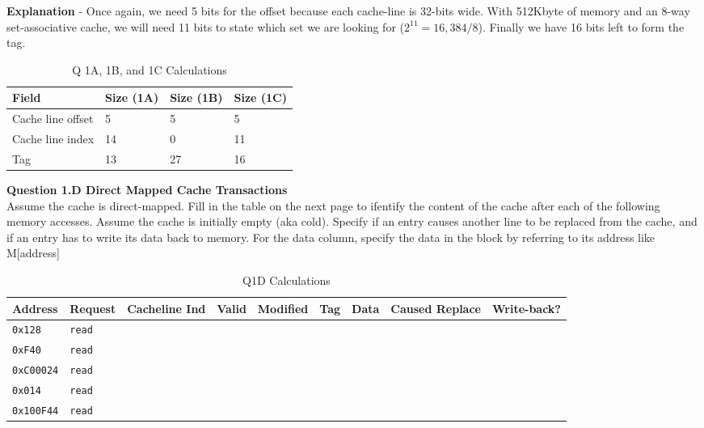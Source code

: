 \documentclass[a4paper,11pt]{article}
\newcommand{\T}{\texttt}
\begin{document}
\textbf{Explanation} - Once again, we need 5 bits for the offset because each cache-line is 32-bits wide. With 512Kbyte of memory and an 8-way set-associative cache, we will need 11 bits to state which set we are looking for ($2^{11} =16,384/8$). Finally we have 16 bits left to form the tag.

\begin{table}[H]
\caption{Q 1A, 1B, and 1C Calculations} \label{tab:q1calc} 
\begin{center}
\begin{tabular}{| l | l | l | l |} \hline 
   Field              &  Size (1A) & Size (1B) & Size (1C)     \\ \hline
   Cache line offset  &  5         &   5       &   5           \\ \hline
   Cache line index   &  14        &   0       &   11          \\ \hline
   Tag                &  13        &   27      &   16          \\ \hline
\end{tabular}
\end{center}
\end{table}



\item \textbf{Question 1.D Direct Mapped Cache Transactions } \\

Assume the cache is direct-mapped. Fill in the table on the next page to ifentify the content of the cache after each of the following memory accesses. Assume the cache is initially empty (aka cold). Specify if an entry causes another line to be replaced from the cache, and if an entry has to write its data back to memory. For the data column, specify the data in the block by referring to its address like M[address]


\begin{table}[H]
\caption{Q1D Calculations} \label{tab:q1calc} 
\begin{center}
\begin{tabular}{| l | l | l | l | l | l | l | l | l |}
\hline
Address  &  Request  & Cacheline Ind & Valid & Modified & Tag & Data & Caused Replace & Write-back?    \\ \hline
\T{0x128}  &  \T{read} & \T{  } & \T{} & \T{} & \T{} & \T{} & \T{} & \T{}    \\ \hline
\T{0xF40}  &  \T{read} & \T{  } & \T{} & \T{} & \T{} & \T{} & \T{} & \T{}    \\ \hline
\T{0xC00024}  &  \T{read} & \T{  } & \T{} & \T{} & \T{} & \T{} & \T{} & \T{}    \\ \hline
\T{0x014}  &  \T{read} & \T{  } & \T{} & \T{} & \T{} & \T{} & \T{} & \T{}    \\ \hline
\T{0x100F44}  &  \T{read} & \T{  } & \T{} & \T{} & \T{} & \T{} & \T{} & \T{}    \\ \hline
\end{tabular}
\end{center}
\end{table}
\end{document}
